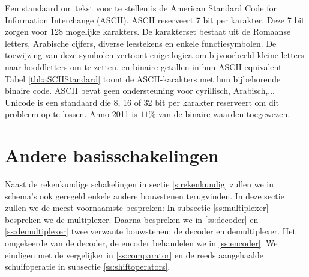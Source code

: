 Een standaard om tekst voor te stellen is de American Standard Code for Information Interchange (ASCII). ASCII reserveert 7 bit per karakter. Deze 7 bit zorgen voor 128 mogelijke karakters. De karakterset bestaat uit de Romaanse letters, Arabische cijfers, diverse leestekens en enkele functiesymbolen. De toewijzing van deze symbolen vertoont enige logica om bijvoorbeeld kleine letters naar hoofdletters om te zetten, en binaire getallen in hun ASCII equivalent. Tabel \ref{tbl:aSCIIStandard} toont de ASCII-karakters met hun bijbehorende binaire code. ASCII bevat geen ondersteuning voor cyrillisch, Arabisch,... Unicode is een standaard die 8, 16 of 32 bit per karakter reserveert om dit probleem op te lossen. Anno 2011 is $11\%$ van de binaire waarden toegewezen.
\section{Andere basisschakelingen}
\label{s:andereBasis}
Naast de rekenkundige schakelingen in sectie \ref{s:rekenkundig} zullen we in schema's ook geregeld enkele andere bouwstenen terugvinden. In deze sectie zullen we de meest voornaamste bespreken: In subsectie \ref{ss:multiplexer} bespreken we de multiplexer. Daarna bespreken we in \ref{ss:decoder} en \ref{ss:demultiplexer} twee verwante bouwstenen: de decoder en demultiplexer. Het omgekeerde van de decoder, de encoder behandelen we in \ref{ss:encoder}. We eindigen met de vergelijker in \ref{ss:comparator} en de reeds aangehaalde schuifoperatie in subsectie \ref{ss:shiftoperators}.

